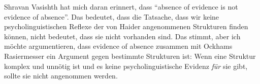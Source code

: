 Shravan Vasishth hat mich daran erinnert, dass "`absence of evidence is not evidence of absence"'. Das bedeutet, dass
die Tatsache, dass wir keine psycholinguistischen Reflexe der von Haider angenommenen Strukturen finden können,
nicht bedeutet, dass sie nicht vorhanden sind. Das stimmt, aber ich möchte argumentieren, dass evidence of absence
zusammen mit Ockhams Rasiermesser ein Argument gegen bestimmte Strukturen ist: Wenn eine Struktur komplex und
unnötig ist und es keine psycholinguistische Evidenz \emph{für} sie gibt, sollte sie nicht angenommen werden.



